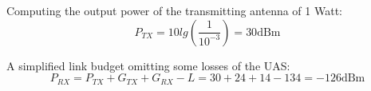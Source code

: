 Computing the output power of the transmitting antenna of 1 Watt:
\begin{equation*}\label{eq:tech_parameters5}
	P_{TX} = 10lg\left (\frac{1}{10^{-3}} \right)  
	       = 30 \text{dBm}
\end{equation*}


A simplified link budget omitting some losses of the UAS:
\begin{equation*}\label{eq:tech_parameters6}
	P_{RX} = P_{TX} + G_{TX} + G_{RX} - L  
	       = 30 + 24 + 14 - 134 = -126 \text{dBm}
\end{equation*}

